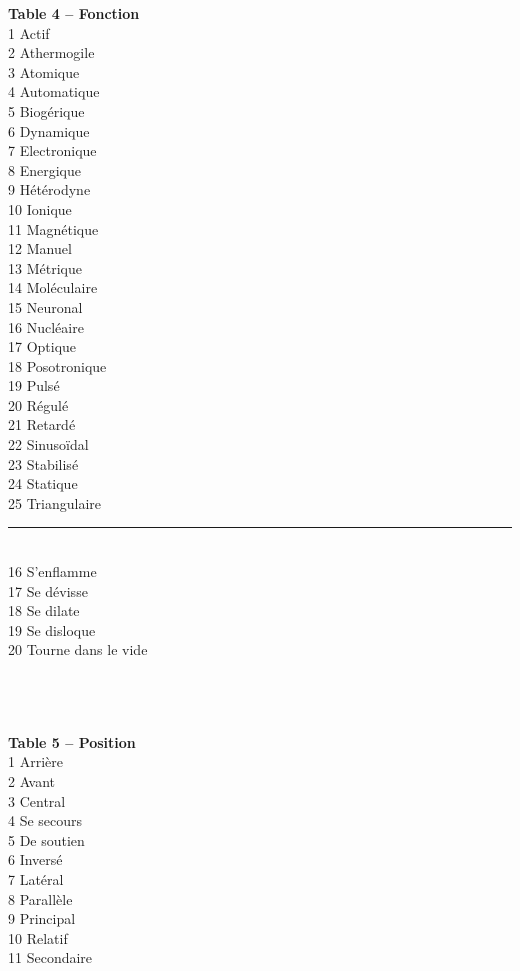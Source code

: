 \documentclass[11pt,twoside,a4paper]{article}
\begin{document}
\begin{table}[ht]
\begin{multicols}{5}
{\textbf{Table 4 -- Fonction}~\\
1	Actif~\\
2	Athermogile~\\
3	Atomique~\\
4	Automatique~\\
5	Biog{\'e}rique~\\
6	Dynamique~\\
7	Electronique~\\
8	Energique~\\
9	H{\'e}t{\'e}rodyne~\\
10	Ionique~\\
11	Magn{\'e}tique~\\
12	Manuel~\\
13	M{\'e}trique~\\
14	Mol{\'e}culaire~\\
15	Neuronal~\\
16	Nucl{\'e}aire~\\
17	Optique~\\
18	Posotronique~\\
19	Puls{\'e}~\\
20	R{\'e}gul{\'e}~\\
21	Retard{\'e}~\\
22	Sinuso{\"i}dal~\\
23	Stabilis{\'e}~\\
24	Statique~\\
25	Triangulaire~\\

\rule{0.15\textwidth}{0.05cm}~\\


16	S'enflamme~\\
17	Se d{\'e}visse~\\
18	Se dilate~\\
19	Se disloque~\\
20	Tourne dans le vide~\\
~\\
~\\
~\\

\columnbreak

\textbf{Table 5 -- Position}~\\
1	Arri{\`e}re~\\
2	Avant~\\
3	Central~\\
4	Se secours~\\
5	De soutien~\\
6	Invers{\'e}~\\
7	Lat{\'e}ral~\\
8	Parall{\`e}le~\\
9	Principal~\\
10	Relatif~\\
11	Secondaire~\\

}
\end{multicols}
\end{table}
\end{document}
